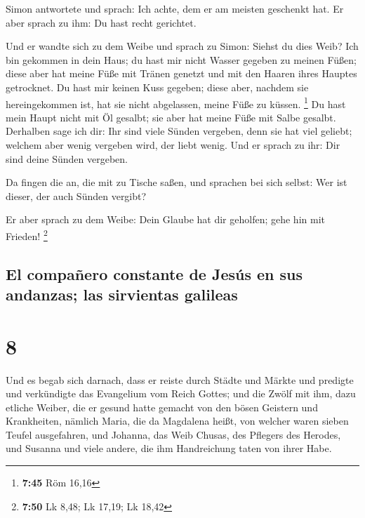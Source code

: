  Simon antwortete und sprach: Ich achte, dem er am
meisten geschenkt hat. Er aber sprach zu ihm: Du hast recht gerichtet.

 Und er wandte sich zu dem Weibe und sprach zu Simon:
Siehst du dies Weib? Ich bin gekommen in dein Haus; du hast mir nicht
Wasser gegeben zu meinen Füßen; diese aber hat meine Füße mit Tränen
genetzt und mit den Haaren ihres Hauptes getrocknet.  Du
hast mir keinen Kuss gegeben; diese aber, nachdem sie hereingekommen
ist, hat sie nicht abgelassen, meine Füße zu küssen. \footnote{\textbf{7:45}
  Röm 16,16}  Du hast mein Haupt nicht mit Öl gesalbt;
sie aber hat meine Füße mit Salbe gesalbt.  Derhalben
sage ich dir: Ihr sind viele Sünden vergeben, denn sie hat viel geliebt;
welchem aber wenig vergeben wird, der liebt wenig.  Und
er sprach zu ihr: Dir sind deine Sünden vergeben.

 Da fingen die an, die mit zu Tische saßen, und sprachen
bei sich selbst: Wer ist dieser, der auch Sünden vergibt?

 Er aber sprach zu dem Weibe: Dein Glaube hat dir
geholfen; gehe hin mit Frieden! \footnote{\textbf{7:50} Lk 8,48; Lk
  17,19; Lk 18,42}

\hypertarget{el-compauxf1ero-constante-de-jesuxfas-en-sus-andanzas-las-sirvientas-galileas}{%
\subsection{El compañero constante de Jesús en sus andanzas; las
sirvientas
galileas}\label{el-compauxf1ero-constante-de-jesuxfas-en-sus-andanzas-las-sirvientas-galileas}}

\hypertarget{section-7}{%
\section{8}\label{section-7}}

 Und es begab sich darnach, dass er reiste durch Städte
und Märkte und predigte und verkündigte das Evangelium vom Reich Gottes;
und die Zwölf mit ihm,  dazu etliche Weiber, die er gesund
hatte gemacht von den bösen Geistern und Krankheiten, nämlich Maria, die
da Magdalena heißt, von welcher waren sieben Teufel ausgefahren,
 und Johanna, das Weib Chusas, des Pflegers des Herodes,
und Susanna und viele andere, die ihm Handreichung taten von ihrer Habe.


